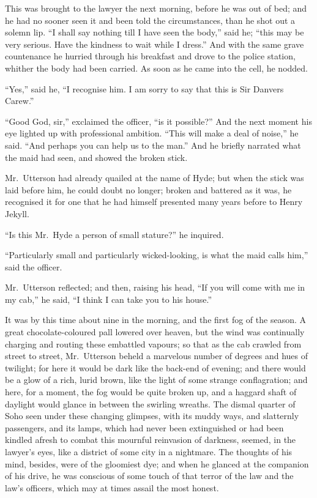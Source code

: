 \documentclass[12pt,openright]{book}
\begin{document}
This was brought to the lawyer the next morning, before he was out of bed; and he had no sooner seen it and been told the circumstances, than he shot out a solemn lip. “I shall say nothing till I have seen the body,” said he; “this may be very serious. Have the kindness to wait while I dress.” And with the same grave countenance he hurried through his breakfast and drove to the police station, whither the body had been carried. As soon as he came into the cell, he nodded.

“Yes,” said he, “I recognise him. I am sorry to say that this is Sir Danvers Carew.”

“Good God, sir,” exclaimed the officer, “is it possible?” And the next moment his eye lighted up with professional ambition. “This will make a deal of noise,” he said. “And perhaps you can help us to the man.” And he briefly narrated what the maid had seen, and showed the broken stick.

Mr. Utterson had already quailed at the name of Hyde; but when the stick was laid before him, he could doubt no longer; broken and battered as it was, he recognised it for one that he had himself presented many years before to Henry Jekyll.

“Is this Mr. Hyde a person of small stature?” he inquired.

“Particularly small and particularly wicked-looking, is what the maid calls him,” said the officer.

Mr. Utterson reflected; and then, raising his head, “If you will come with me in my cab,” he said, “I think I can take you to his house.”

It was by this time about nine in the morning, and the first fog of the season. A great chocolate-coloured pall lowered over heaven, but the wind was continually charging and routing these embattled vapours; so that as the cab crawled from street to street, Mr. Utterson beheld a marvelous number of degrees and hues of twilight; for here it would be dark like the back-end of evening; and there would be a glow of a rich, lurid brown, like the light of some strange conflagration; and here, for a moment, the fog would be quite broken up, and a haggard shaft of daylight would glance in between the swirling wreaths. The dismal quarter of Soho seen under these changing glimpses, with its muddy ways, and slatternly passengers, and its lamps, which had never been extinguished or had been kindled afresh to combat this mournful reinvasion of darkness, seemed, in the lawyer’s eyes, like a district of some city in a nightmare. The thoughts of his mind, besides, were of the gloomiest dye; and when he glanced at the companion of his drive, he was conscious of some touch of that terror of the law and the law’s officers, which may at times assail the most honest.
\end{document}
